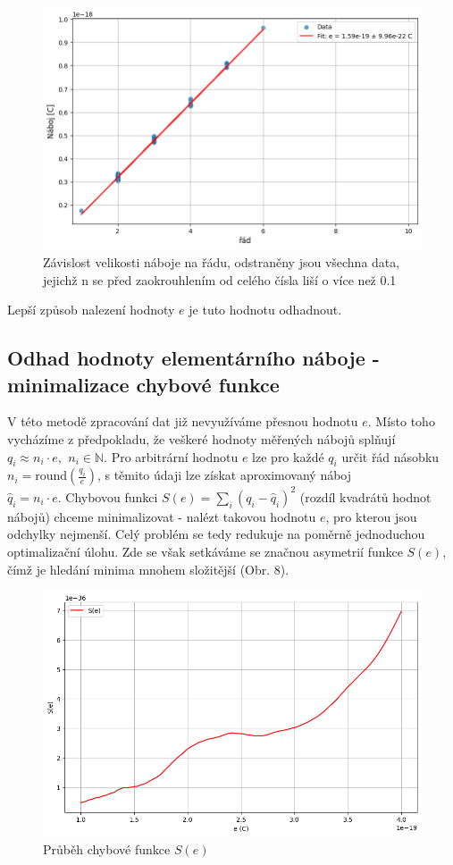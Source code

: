 \documentclass[czech,11pt,a4paper]{article}
\begin{document}
\begin{multicols}{2}
		 \begin{figure}[H]
		 	\centering
		 	\includegraphics[width=0.8\linewidth]{fit2}
		 	\caption{Závislost velikosti náboje na řádu, odstraněny jsou všechna data, jejichž n se před zaokrouhlením od celého čísla liší o více než 0.1}
		 	
		 \end{figure}
		 
		 Lepší způsob nalezení hodnoty $e$ je tuto hodnotu odhadnout.
		 \subsection{Odhad hodnoty elementárního náboje - minimalizace chybové funkce}
		 V této metodě zpracování dat již nevyužíváme přesnou hodnotu $e$. Místo toho vycházíme z předpokladu, že veškeré hodnoty měřených nábojů splňují $q_i \approx n_i \cdot e ,\,\ n_i \in \mathbb{N}$. Pro arbitrární hodnotu $e$ lze pro každé $q_i$ určit řád násobku $n_i = \mathrm{round}(\frac{q_i}{e})$, s těmito údaji lze získat aproximovaný náboj \\ $\hat{q}_i = n_i \cdot e$. Chybovou funkci $S(e) = \sum_i (q_i - \hat{q}_i)^2$ (rozdíl kvadrátů hodnot nábojů) chceme minimalizovat - nalézt takovou hodnotu $e$, pro kterou jsou odchylky nejmenší. Celý problém se tedy redukuje na poměrně jednoduchou optimalizační úlohu. Zde se však setkáváme se značnou asymetrií funkce $S(e)$, čímž je hledání minima mnohem složitější (Obr. 8). 
			
		\begin{figure}[H]
			\centering
			\includegraphics[width=0.5\linewidth]{plot3}
			\caption{Průběh chybové funkce $S(e)$}
			

\end{figure}
\end{multicols}
\end{document}
